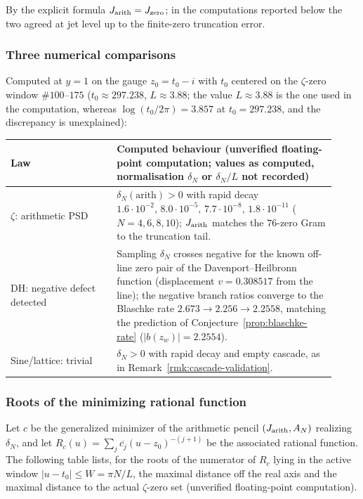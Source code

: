 \documentclass[11pt]{amsart}
\theoremstyle{definition}
\theoremstyle{remark}
\theoremstyle{definition}
\begin{document}
By the explicit formula $J_{\rm arith}=J_{\rm zero}$; in the computations reported below the two
agreed at jet level up to the finite-zero truncation error.

\subsubsection*{Three numerical comparisons}

Computed at $y=1$ on the gauge $z_0=t_0-i$ with $t_0$ centered on the $\zeta$-zero window
$\#100$--$175$ ($t_0\approx297.238$, $L\approx3.88$; the value $L\approx3.88$ is the one used in the computation, whereas $\log(t_0/2\pi)=3.857$ at $t_0=297.238$, and the discrepancy is unexplained):

\begin{longtable}{@{}p{0.30\linewidth}p{0.62\linewidth}@{}}
\toprule
Law & Computed behaviour (unverified floating-point computation; values as computed, normalisation $\delta_N$ or $\delta_N/L$ not recorded) \\
\midrule
\endhead
$\zeta$: arithmetic PSD & $\delta_N(\text{arith})>0$ with rapid decay
$1.6\!\cdot\!10^{-2},\,8.0\!\cdot\!10^{-5},\,7.7\!\cdot\!10^{-8},\,1.8\!\cdot\!10^{-11}$
($N=4,6,8,10$); $J_{\rm arith}$ matches the $76$-zero Gram to the truncation tail. \\
DH: negative defect detected & Sampling $\delta_N$ crosses negative for the known off-line zero pair of the Davenport--Heilbronn function (displacement $v=0.308517$ from the line); the negative branch ratios converge to the Blaschke rate
$2.673\to2.256\to\mathbf{2.2558}$, matching the prediction of
Conjecture~\ref{prop:blaschke-rate}
($|b(z_w)|=2.2554$). \\
Sine/lattice: trivial & $\delta_N>0$ with rapid decay and empty cascade, as in
Remark~\ref{rmk:cascade-validation}. \\
\bottomrule
\end{longtable}

\subsubsection*{Roots of the minimizing rational function}

Let $c$ be the generalized minimizer of the arithmetic pencil $(J_{\rm arith},A_N)$ realizing
$\delta_N$, and let $R_c(u)=\sum_j\overline{c_j}(u-z_0)^{-(j+1)}$ be the associated rational function.
The following table lists, for the roots of the numerator of $R_c$ lying in the active window
$|u-t_0|\le W=\pi N/L$, the maximal distance off the real axis and the maximal distance to the actual
$\zeta$-zero set (unverified floating-point computation).
\end{document}
